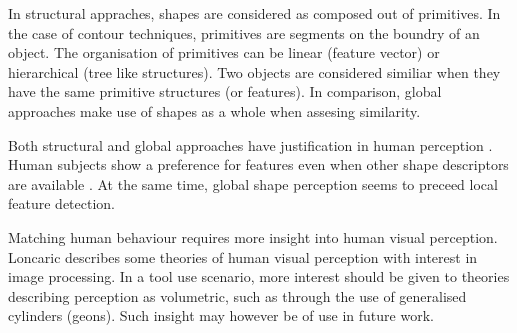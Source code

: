 \documentclass[11]{article}
\begin{document}
In structural appraches, shapes are considered as composed out of primitives. In the case of contour techniques, primitives are segments on the boundry of an object. The organisation of primitives can be linear (feature vector\cite{zhang2004}) or hierarchical (tree like structures\cite{zhu2015}). Two objects are considered similiar when they have the same primitive structures (or features). In comparison, global approaches make use of shapes as a whole when assesing similarity. 

Both structural and global approaches have justification in human perception \cite{zhang2004}. Human subjects show a preference for features even when other shape descriptors are available \cite{chatbri2016}. At the same time, global shape perception seems to preceed local feature detection\cite{navon1977}. 

Matching human behaviour requires more insight into human visual perception. Loncaric\cite{loncaric1998} describes some theories of human visual perception with interest in image processing. In a tool use scenario, more interest should be given to theories describing perception as volumetric, such as through the use of generalised cylinders (geons\cite{dickinson2014}). Such insight may however be of use in future work.    

\printbibliography
\end{document}
